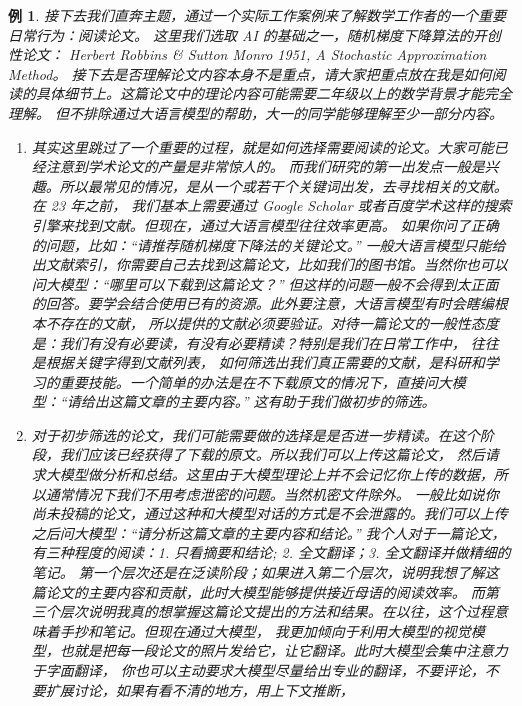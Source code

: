 \documentclass{ctexbook}
\newtheorem{example}[theorem]{例}
\numberwithin{theorem}{chapter}
\begin{document}
\begin{example}
  接下去我们直奔主题，通过一个实际工作案例来了解数学工作者的一个重要日常行为：阅读论文。
  这里我们选取 AI 的基础之一，随机梯度下降算法的开创性论文：
  Herbert Robbins \textup{\&} Sutton Monro 1951, A Stochastic Approximation Method\cite{robbins1951stochastic}。 
  接下去是否理解论文内容本身不是重点，请大家把重点放在我是如何阅读的具体细节上。这篇论文中的理论内容可能需要二年级以上的数学背景才能完全理解。
  但不排除通过大语言模型的帮助，大一的同学能够理解至少一部分内容。

  \begin{enumerate}
    \item 其实这里跳过了一个重要的过程，就是如何选择需要阅读的论文。大家可能已经注意到学术论文的产量是非常惊人的。
    而我们研究的第一出发点一般是兴趣。所以最常见的情况，是从一个或若干个关键词出发，去寻找相关的文献。在 23 年之前，
    我们基本上需要通过 Google Scholar 或者百度学术这样的搜索引擎来找到文献。但现在，通过大语言模型往往效率更高。
    如果你问了正确的问题，比如：“请推荐随机梯度下降法的关键论文。” 
    一般大语言模型只能给出文献索引，你需要自己去找到这篇论文，比如我们的图书馆。当然你也可以问大模型：“哪里可以下载到这篇论文？” 
    但这样的问题一般不会得到太正面的回答。要学会结合使用已有的资源。此外要注意，大语言模型有时会瞎编根本不存在的文献，
    所以提供的文献必须要验证。对待一篇论文的一般性态度是：我们有没有必要读，有没有必要精读？特别是我们在日常工作中，
    往往是根据关键字得到文献列表，
    如何筛选出我们真正需要的文献，是科研和学习的重要技能。一个简单的办法是在不下载原文的情况下，直接问大模型：“请给出这篇文章的主要内容。”
    这有助于我们做初步的筛选。
    \item 对于初步筛选的论文，我们可能需要做的选择是是否进一步精读。在这个阶段，我们应该已经获得了下载的原文。所以我们可以上传这篇论文，
    然后请求大模型做分析和总结。这里由于大模型理论上并不会记忆你上传的数据，所以通常情况下我们不用考虑泄密的问题。当然机密文件除外。
    一般比如说你尚未投稿的论文，通过这种和大模型对话的方式是不会泄露的。我们可以上传之后问大模型：“请分析这篇文章的主要内容和结论。”
    我个人对于一篇论文，有三种程度的阅读：1. 只看摘要和结论; 2. 全文翻译；3. 全文翻译并做精细的笔记。
    第一个层次还是在泛读阶段；如果进入第二个层次，说明我想了解这篇论文的主要内容和贡献，此时大模型能够提供接近母语的阅读效率。
    而第三个层次说明我真的想掌握这篇论文提出的方法和结果。在以往，这个过程意味着手抄和笔记。但现在通过大模型，
    我更加倾向于利用大模型的视觉模型，也就是把每一段论文的照片发给它，让它翻译。此时大模型会集中注意力于字面翻译，
    你也可以主动要求大模型尽量给出专业的翻译，不要评论，不要扩展讨论，如果有看不清的地方，用上下文推断，

\end{enumerate}
\end{example}
\end{document}
